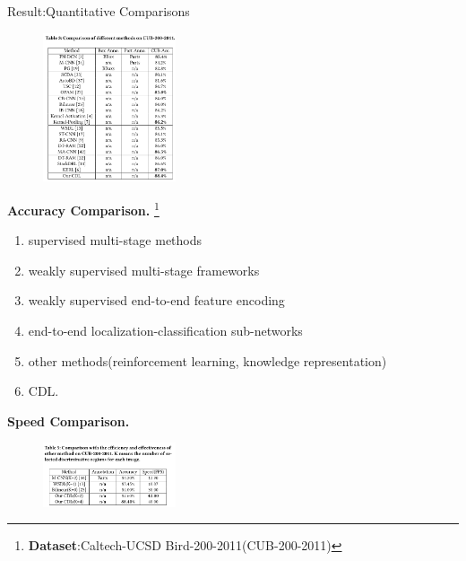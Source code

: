 \begin{frame}{Result:Quantitative Comparisons}
    \begin{figure}    %
        \centering
        \includegraphics[width=0.35\textwidth]{docs/paperReading/CDL/comparison-1.png}        
    \end{figure}    
    \begin{scriptsize}
        \textbf{Accuracy Comparison.} \footnote{\textbf{Dataset}:Caltech-UCSD Bird-200-2011(CUB-200-2011)}        
        \begin{enumerate}
            \item supervised multi-stage methods
            \item weakly supervised multi-stage frameworks
            \item weakly supervised end-to-end feature encoding
            \item end-to-end localization-classification sub-networks
            \item other methods(reinforcement learning, knowledge representation)
            \item CDL.
        \end{enumerate}
        \textbf{Speed Comparison.}
        \begin{figure}
            \centering
            \includegraphics[width=0.35\textwidth]{docs/paperReading/CDL/comparison-2.png}
        \end{figure}
    \end{scriptsize}
\end{frame}


